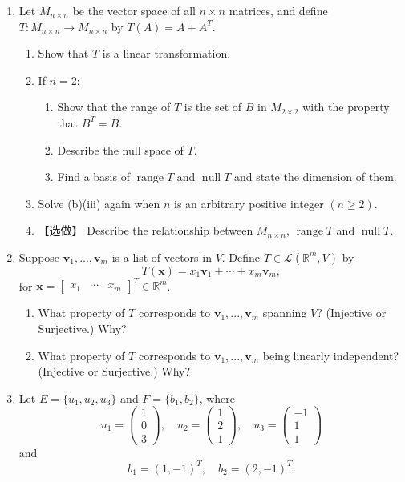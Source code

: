 \documentclass[a4paper,11pt]{article}
\begin{document}
\begin{enumerate}
\item Let $M_{n \times n}$ be the vector space of all $n \times n$ matrices, and define $T: M_{n \times n}\to M_{n \times n}$ by $T(A) = A + A^T$.

\begin{enumerate}[leftmargin=2em,label=(\alph*)]
  \item Show that $T$ is a linear transformation.
  \newpage
  \item If $n = 2$:
  \begin{enumerate}[label=(\roman*)]
    \item Show that the range of $T$ is the set of $B$ in $M_{2 \times 2}$ with the property that $B^T = B$.
    \item Describe the null space of $T$.
    \item Find a basis of $\operatorname{range} T$ and $\operatorname{null} T$ and state the dimension of them.
  \end{enumerate} 
  \item Solve (b)(iii) again when $n$ is an arbitrary positive integer $(n\ge 2)$.
  \item 【选做】 Describe the relationship between $M_{n\times n}$, $\operatorname{range} T$ and $\operatorname{null} T$.
\end{enumerate}
      \newpage
  \item  Suppose $\mathbf{v}_1,...,\mathbf{v}_m$ is a list of vectors in $V$. Define $T\in\mathcal{L}(\mathbb{R}^m,V)$ by
  $$T(\mathbf{x})=x_1\mathbf{v}_1+\cdots+x_m\mathbf{v}_m,$$
  for $\mathbf{x}=\left[\begin{matrix}
  x_1&
  \cdots&
  x_m
  \end{matrix}\right]^T\in\mathbb{R}^m$. 

 \begin{enumerate}
 \item What property of $T$ corresponds to $\mathbf{v}_1,...,\mathbf{v}_m$ spanning $V$? (Injective or Surjective.) Why?
\item What property of $T$ corresponds to $\mathbf{v}_1,...,\mathbf{v}_m$ being linearly independent? (Injective or Surjective.) Why?
 \end{enumerate}
 \vspace{15em}
 \item Let \( E = \{u_1, u_2, u_3\} \) and \( F = \{b_1, b_2\} \), where
\[
u_1 =
\begin{pmatrix}
1 \\
0 \\
3
\end{pmatrix}, \quad
u_2 =
\begin{pmatrix}
1 \\
2 \\
1
\end{pmatrix}, \quad
u_3 =
\begin{pmatrix}
-1 \\
1 \\
1
\end{pmatrix}
\]
and
\[
b_1 = (1, -1)^T, \quad b_2 = (2, -1)^T.
\]


\end{enumerate}
\end{document}
